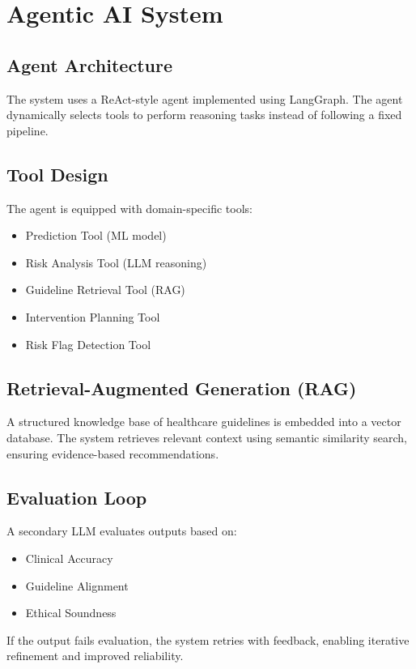 \documentclass[12pt]{article}
\begin{document}

\section{Agentic AI System}

\subsection{Agent Architecture}
The system uses a ReAct-style agent implemented using LangGraph. The agent dynamically selects tools to perform reasoning tasks instead of following a fixed pipeline.

\subsection{Tool Design}
The agent is equipped with domain-specific tools:
\begin{itemize}
    \item Prediction Tool (ML model)
    \item Risk Analysis Tool (LLM reasoning)
    \item Guideline Retrieval Tool (RAG)
    \item Intervention Planning Tool
    \item Risk Flag Detection Tool
\end{itemize}

\subsection{Retrieval-Augmented Generation (RAG)}
A structured knowledge base of healthcare guidelines is embedded into a vector database. The system retrieves relevant context using semantic similarity search, ensuring evidence-based recommendations.

\subsection{Evaluation Loop}
A secondary LLM evaluates outputs based on:
\begin{itemize}
    \item Clinical Accuracy
    \item Guideline Alignment
    \item Ethical Soundness
\end{itemize}

If the output fails evaluation, the system retries with feedback, enabling iterative refinement and improved reliability.
\end{document}
